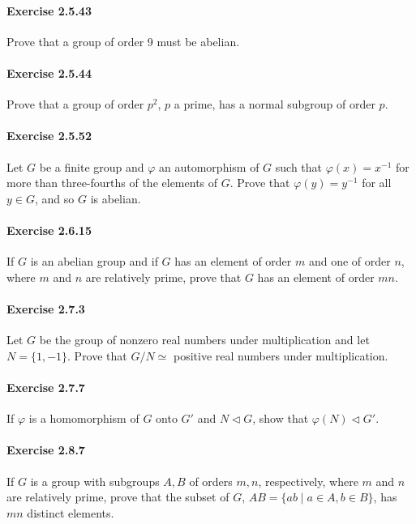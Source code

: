 \documentclass{article}
\begin{document}
\paragraph{Exercise 2.5.43} Prove that a group of order 9 must be abelian.

\paragraph{Exercise 2.5.44} Prove that a group of order $p^2$, $p$ a prime, has a normal subgroup of order $p$.

\paragraph{Exercise 2.5.52} Let $G$ be a finite group and $\varphi$ an automorphism of $G$ such that $\varphi(x) = x^{-1}$ for more than three-fourths of the elements of $G$. Prove that $\varphi(y) = y^{-1}$ for all $y \in G$, and so $G$ is abelian.

\paragraph{Exercise 2.6.15} If $G$ is an abelian group and if $G$ has an element of order $m$ and one of order $n$, where $m$ and $n$ are relatively prime, prove that $G$ has an element of order $mn$.

\paragraph{Exercise 2.7.3} Let $G$ be the group of nonzero real numbers under multiplication and let $N = \{1, -1\}$. Prove that $G / N \simeq$ positive real numbers under multiplication.

\paragraph{Exercise 2.7.7} If $\varphi$ is a homomorphism of $G$ onto $G'$ and $N \triangleleft G$, show that $\varphi(N) \triangleleft G'$.

\paragraph{Exercise 2.8.7} If $G$ is a group with subgroups $A, B$ of orders $m, n$, respectively, where $m$ and $n$ are relatively prime, prove that the subset of $G$, $AB = \{ab \mid a \in A, b \in B\}$, has $mn$ distinct elements.
\end{document}
